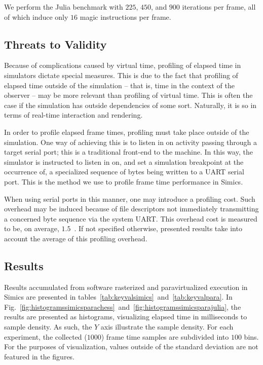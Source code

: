 We perform the Julia benchmark with $225$, $450$, and $900$ iterations per frame, all of which induce only $16$ magic instructions per frame.

\subsection{Threats to Validity}
\label{sec:threatstovalidity}
Because of complications caused by virtual time, profiling of elapsed time in simulators dictate special measures.
This is due to the fact that profiling of elapsed time outside of the simulation -- that is, time in the context of the observer -- may be more relevant than profiling of virtual time.
This is often the case if the simulation has outside dependencies of some sort.
Naturally, it is so in terms of real-time interaction and rendering.

In order to profile elapsed frame times, profiling must take place outside of the simulation.
One way of achieving this is to listen in on activity passing through a target serial port; this is a traditional front-end to the machine.
In this way, the simulator is instructed to listen in on, and set a simulation breakpoint at the occurrence of, a specialized sequence of bytes being written to a UART serial port.
This is the method we use to profile frame time performance in Simics.

When using serial ports in this manner, one may introduce a profiling cost.
Such overhead may be induced because of file descriptors not immediately transmitting a concerned byte sequence via the system UART.
This overhead cost is measured to be, on average, $1.5$~\milli\second .
If not specified otherwise, presented results take into account the average of this profiling overhead.

\subsection{Results}
\label{sec:results}
Results accumulated from software rasterized and paravirtualized execution in Simics are presented in tables~\ref{tab:keyvalsimics}~and~\ref{tab:keyvalpara}.
In Fig.~\ref{fig:histogramssimicsparachess}~and~\ref{fig:histogramssimicsparajulia}, the results are presented as histograms, visualizing elapsed time in milliseconds to sample density.
As such, the $Y$ axis illustrate the sample density.
For each experiment, the collected ($1000$) frame time samples are subdivided into $100$ bins.
For the purposes of visualization, values outside of the standard deviation are not featured in the figures.

